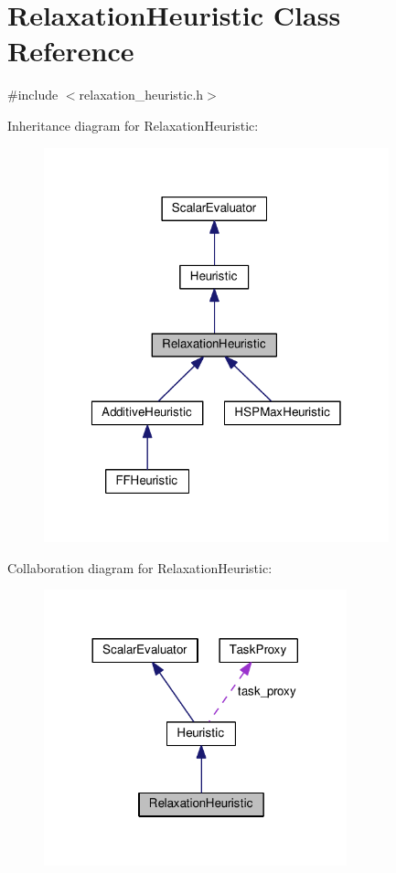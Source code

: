\hypertarget{classRelaxationHeuristic}{\section{Relaxation\-Heuristic Class Reference}
\label{classRelaxationHeuristic}
}


{\ttfamily \#include $<$relaxation\-\_\-heuristic.\-h$>$}



Inheritance diagram for Relaxation\-Heuristic\-:
\nopagebreak
\begin{figure}[H]
\begin{center}
\leavevmode
\includegraphics[width=283pt]{classRelaxationHeuristic__inherit__graph}
\end{center}
\end{figure}


Collaboration diagram for Relaxation\-Heuristic\-:
\nopagebreak
\begin{figure}[H]
\begin{center}
\leavevmode
\includegraphics[width=248pt]{classRelaxationHeuristic__coll__graph}
\end{center}
\end{figure}
